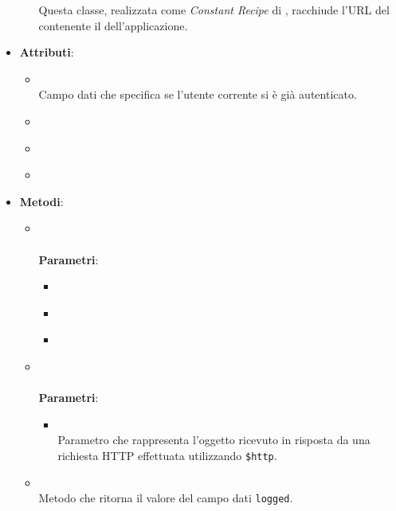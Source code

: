 \begin{itemize}
\begin{itemize}
Questa classe, realizzata come \textit{Constant Recipe} di , racchiude l'URL del  contenente il  dell'applicazione.
\end{itemize}
\item \textbf{Attributi}:
\begin{itemize}
\item {}
\\ Campo dati che specifica se l'utente corrente si è già autenticato.
\item {}
\\ \dpConstantServiceField
\item {}
\\ \dpHttpField
\item {}
\\ \dpQField
\end{itemize}
\item \textbf{Metodi}:
\begin{itemize}
\item {}
\\ \dpConstructor
\\ \textbf{Parametri}:
\begin{itemize}
\item {}
\\ \dpHttpParam
\item {}
\\ \dpConstantServiceParam
\item {}
\\ \dpQParam
\end{itemize}
\item {}
\\ \dpHandleError
\\ \textbf{Parametri}:
\begin{itemize}
\item {}
\\ Parametro che rappresenta l'oggetto ricevuto in risposta da una richiesta HTTP effettuata utilizzando \texttt{\$http}.
\end{itemize}
\item {}
\\ Metodo che ritorna il valore del campo dati \texttt{logged}.

\end{itemize}
\end{itemize}
